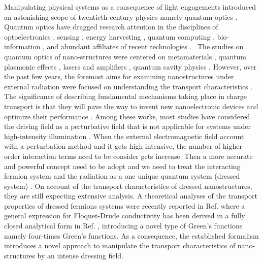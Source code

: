 Manipulating physical systems as a consequence of light engagements introduced an astonishing scope of twentieth-century physics namely quantum optics \cite{grynberg10}.
Quantum optics have dragged research attention in the disciplines of optoelectronics \cite{liu16,wijesekara20,tao21}, sensing \cite{rodrigo2015,pirandola18,hapuarachchi2018}, energy harvesting \cite{yuan16,sun18},
quantum computing \cite{huh15,slussarenko19,andersen21}, bio-information \cite{marais18,bian20}, and abundant affiliates of recent technologies \cite{rivera20}. 
The studies on quantum optics of nano-structures were centered on metamaterials \cite{shalaev07,si14}, quantum plasmonic effects \cite{hapuarachchi19,perera20}, lasers and amplifiers \cite{zhang05,chow13}, quantum cavity physics \cite{tsang10,devi20}.
However, over the past few years, the foremost aims for examining nanostructures under external radiation were focused on understanding the transport characteristics \cite{kitagawa11,zhou11,kibis14,pervishko15,morina15,dehghani15,dini16,wackerl20}. 
The significance of describing fundamental mechanisms taking place in charge transport is that they will pave the way to invent new nanoelectronic devices and optimize their performance \cite{premaratne21}.
Among these works, most studies have considered the driving field as a perturbative field \cite{pervishko15,morina15} that is not applicable for systems under high-intensity illumination \cite{grifoni98,wackerl20}. When the external electromagnetic field account with a perturbation method and it gets high intensive, the number of higher-order interaction terms need to be consider gets increase. Then a more accurate and powerful concept need to be adopt and we need to treat the interacting fermion system and the radiation as a one unique quantum system (dressed system) \cite{morina15,cohen98,scully01}. On account of the transport characteristics of dressed nanostructures, they are still expecting extensive analysis.
A theoretical analyses of the transport properties of dressed fermions systems were recently reported in Ref. \cite{kibis14,morina15,wackerl20} where a general expression for Floquet-Drude conductivity has been derived in a fully closed analytical form in Ref. \cite{wackerl20}, introducing a novel type of Green’s functions namely four-times Green’s functions. As a consequence, the established formalism introduces a novel approach to manipulate the transport characteristics of nano-structures by an intense dressing field.

